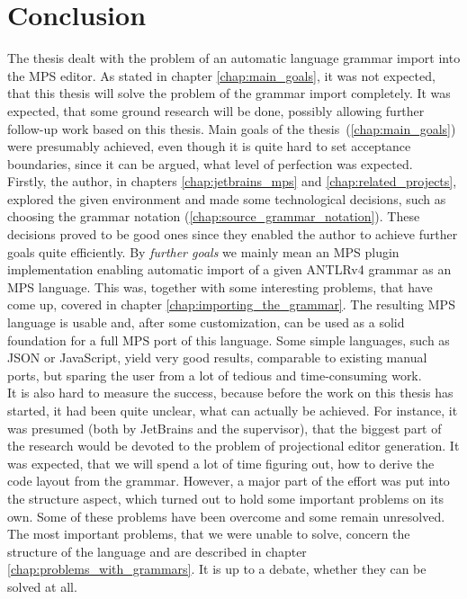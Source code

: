 \chapter{Conclusion}

The thesis dealt with the problem of an automatic language grammar import into the MPS editor.
As stated in chapter \ref{chap:main_goals}, it was not expected, that this thesis will solve the problem of the grammar import completely.
It was expected, that some ground research will be done, possibly allowing further follow-up work based on this thesis.
Main goals of the thesis~(\ref{chap:main_goals}) were presumably achieved, even though it is quite hard to set acceptance boundaries, since it can be argued, what level of perfection was expected.
\\

Firstly, the author, in chapters \ref{chap:jetbrains_mps} and \ref{chap:related_projects}, explored the given environment and made some technological decisions, such as choosing the grammar notation (\ref{chap:source_grammar_notation}).
These decisions proved to be good ones since they enabled the author to achieve further goals quite efficiently.
By \textit{further goals} we mainly mean an MPS plugin implementation enabling automatic import of a given ANTLRv4 grammar as an MPS language. This was, together with some interesting problems, that have come up, covered in chapter \ref{chap:importing_the_grammar}.
The resulting MPS language is usable and, after some customization, can be used as a solid foundation for a full MPS port of this language.
Some simple languages, such as JSON or JavaScript, yield very good results, comparable to existing manual ports, but sparing the user from a lot of tedious and time-consuming work.
\\

It is also hard to measure the success, because before the work on this thesis has started, it had been quite unclear, what can actually be achieved.
For instance, it was presumed (both by JetBrains and the supervisor), that the biggest part of the research would be devoted to the problem of projectional editor generation.
It was expected, that we will spend a lot of time figuring out, how to derive the code layout from the grammar.
However, a major part of the effort was put into the structure aspect, which turned out to hold some important problems on its own.
Some of these problems have been overcome and some remain unresolved.
The most important problems, that we were unable to solve, concern the structure of the language and are described in chapter \ref{chap:problems_with_grammars}.
It is up to a debate, whether they can be solved at all.
\\

